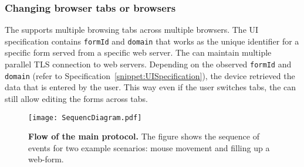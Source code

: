 \subsubsection{\bfseries Changing browser tabs or browsers}
The \device supports multiple browsing tabs across multiple browsers. The UI specification contains \texttt{formId} and \texttt{domain} that works as the unique identifier for a specific form served from a specific web server. The \device can maintain multiple parallel TLS connection to web servers. Depending on the observed \texttt{formId} and \texttt{domain} (refer to Specification~\ref{snippet:UISpecification}), the device retrieved the data that is entered by the user. This way even if the user switches tabs, the \device can still allow editing the forms across tabs.



\iffalse
\begin{figure}[t]
\centering
\texttt{[image: systemDesign.pdf]}
\caption{\textbf{Flow of the \name main protocol.} The figure shows the high-level protocol flow and the main messages that are exchanged between the remote server, host, \device, and the Io devices.}
\spacesave
\label{fig:systemDesign}
\centering
\end{figure}
\fi

\begin{figure}[t]
\centering
\texttt{[image: SequencDiagram.pdf]}
\caption{\textbf{Flow of the \name main protocol.} The figure shows the
sequence of events for two example scenarios: mouse movement and filling up a
web-form.}
\spacesave
\label{fig:sequence}
\centering
\end{figure}




